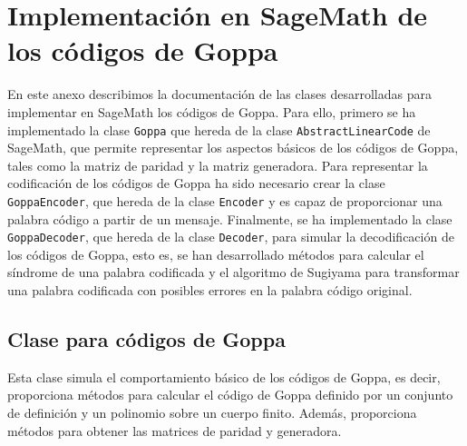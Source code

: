 \chapter[Implementación en SageMath de los códigos de Goppa]{Implementación en SageMath de los códigos de Goppa}
\label{annex:sage-Goppa}

En este anexo describimos la documentación de las clases desarrolladas para implementar en SageMath los códigos de Goppa. Para ello, primero se ha implementado la clase \texttt{Goppa} que hereda de la clase \texttt{AbstractLinearCode} de SageMath, que permite representar los aspectos básicos de los códigos de Goppa, tales como la matriz de paridad y la matriz generadora. Para representar la codificación de los códigos de Goppa ha sido necesario crear la clase \texttt{GoppaEncoder}, que hereda de la clase \texttt{Encoder} y es capaz de proporcionar una palabra código a partir de un mensaje. Finalmente, se ha implementado la clase \texttt{GoppaDecoder}, que hereda de la clase \texttt{Decoder}, para simular la decodificación de los códigos de Goppa, esto es, se han desarrollado métodos para calcular el síndrome de una palabra codificada y el algoritmo de Sugiyama para transformar una palabra codificada con posibles errores en la palabra código original.


\section{Clase para códigos de Goppa}

Esta clase simula el comportamiento básico de los códigos de Goppa, es decir, proporciona métodos para calcular el código de Goppa definido por un conjunto de definición y un polinomio sobre un cuerpo finito. Además, proporciona métodos para obtener las matrices de paridad y generadora.

